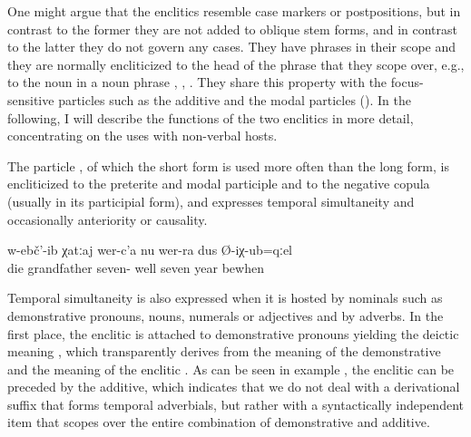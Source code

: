One might argue that the enclitics resemble case markers or postpositions, but in contrast to the former they are not added to oblique stem forms, and in contrast to the latter they do not govern any cases. They have phrases in their scope and they are normally encliticized to the head of the phrase that they scope over, e.g., to the noun in a noun phrase , , . They share this property with the focus-sensitive particles such as the additive and the modal particles (). In the following, I will describe the functions of the two enclitics in more detail, concentrating on the uses with non-verbal hosts.

The particle , of which the short form is used more often than the long form, is encliticized to the preterite and modal participle and to the negative copula (usually in its participial form), and expresses temporal simultaneity  and occasionally anteriority or causality. 

\begin{exe}
	\ex	\label{ex:‎Grandfather died when he was 77 years old}
	\gll	w-ebč'-ib	χatːaj	wer-c'a	nu	wer-ra	dus	Ø-iχ-ub=qːel\\
		die	grandfather	seven-	well seven	year	bewhen\\
	\glt	{}
\end{exe}

Temporal simultaneity is also expressed when it is hosted by nominals such as demonstrative pronouns, nouns, numerals or adjectives and by adverbs. In the first place, the enclitic is attached to demonstrative pronouns yielding the deictic meaning , which transparently derives from the meaning of the demonstrative and the meaning of the enclitic . As can be seen in example , the enclitic can be preceded by the additive, which indicates that we do not deal with a derivational suffix that forms temporal adverbials, but rather with a syntactically independent item that scopes over the entire combination of demonstrative and additive. 

